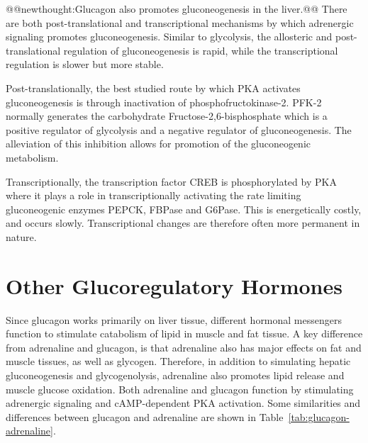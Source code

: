 \documentclass{tufte-handout}
\makeatletter
\def\newthought#1{@@newthought:#1@@}
\makeatother
\begin{document}
\newthought{Glucagon also promotes gluconeogenesis in the liver.}  There are both post-translational and transcriptional mechanisms by which adrenergic signaling promotes gluconeogenesis.  Similar to glycolysis, the allosteric and post-translational regulation of gluconeogenesis is rapid, while the transcriptional regulation is slower but more stable.

Post-translationally, the best studied route by which PKA activates gluconeogenesis is through inactivation of phosphofructokinase-2.  PFK-2 normally generates the carbohydrate Fructose-2,6-bisphosphate which is a positive regulator of glycolysis and a negative regulator of gluconeogenesis.  The alleviation of this inhibition allows for promotion of the gluconeogenic metabolism.  

Transcriptionally, the transcription factor CREB is phosphorylated by PKA where it plays a role in transcriptionally activating the rate limiting gluconeogenic enzymes PEPCK, FBPase and G6Pase.  This is energetically costly, and occurs slowly.  Transcriptional changes are therefore often more permanent in nature.

\section{Other Glucoregulatory Hormones}

Since glucagon works primarily on liver tissue, different hormonal messengers function to stimulate catabolism of lipid in muscle and fat tissue.  A key difference from adrenaline and glucagon, is that adrenaline also has major effects on fat and muscle tissues, as well as glycogen.  Therefore, in addition to simulating hepatic gluconeogenesis and glycogenolysis, adrenaline also promotes lipid release and muscle glucose oxidation.  Both adrenaline and glucagon function by stimulating adrenergic signaling and cAMP-dependent PKA activation.  Some similarities and differences between glucagon and adrenaline are shown in Table~\ref{tab:glucagon-adrenaline}.
\end{document}
